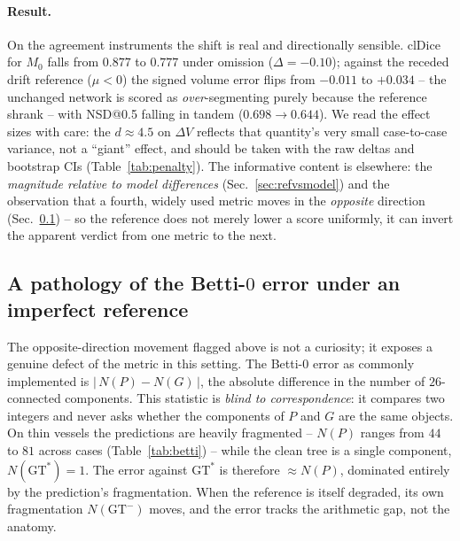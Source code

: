 \documentclass[
    bookmarks, bookmarksnumbered, bookmarksopen,
    colorlinks=true, citecolor=blue, linkcolor=blue, urlcolor=blue
]{techrep}
\newcommand{\gtstar}{\ensuremath{\mathrm{GT}^{\!*}}}
\newcommand{\gtminus}{\ensuremath{\mathrm{GT}^{\!-}}}
\begin{document}
\paragraph{Result.} On the agreement instruments the shift is real and directionally sensible.
clDice for $M_0$ falls from $0.877$ to $0.777$ under omission ($\Delta{=}{-}0.10$); against the
receded drift reference ($\mu{<}0$) the signed volume error flips from $-0.011$ to $+0.034$ --
the unchanged network is scored as \emph{over}-segmenting purely because the reference shrank --
with NSD@0.5 falling in tandem ($0.698\!\to\!0.644$). We read the effect sizes with care: the
$d\approx4.5$ on $\Delta V$ reflects that quantity's very small case-to-case variance, not a
``giant'' effect, and should be taken with the raw deltas and bootstrap CIs
(Table~\ref{tab:penalty}). The informative content is elsewhere: the \emph{magnitude relative to
model differences} (Sec.~\ref{sec:refvsmodel}) and the observation that a fourth, widely used
metric moves in the \emph{opposite} direction (Sec.~\ref{sec:betti}) -- so the reference does not
merely lower a score uniformly, it can invert the apparent verdict from one metric to the next.

\subsection{A pathology of the Betti-$0$ error under an imperfect reference}\label{sec:betti}
The opposite-direction movement flagged above is not a curiosity; it exposes a genuine defect of
the metric in this setting. The Betti-$0$ error as commonly implemented is
$|\,N(P)-N(G)\,|$, the absolute difference in the number of $26$-connected components. This
statistic is \emph{blind to correspondence}: it compares two integers and never asks whether the
components of $P$ and $G$ are the same objects. On thin vessels the predictions are heavily
fragmented -- $N(P)$ ranges from $44$ to $81$ across cases (Table~\ref{tab:betti}) -- while the
clean tree is a single component, $N(\gtstar){=}1$. The error against $\gtstar$ is therefore
$\approx N(P)$, dominated entirely by the prediction's fragmentation. When the reference is
itself degraded, its own fragmentation $N(\gtminus)$ moves, and the error tracks the arithmetic
gap, not the anatomy.
\end{document}
